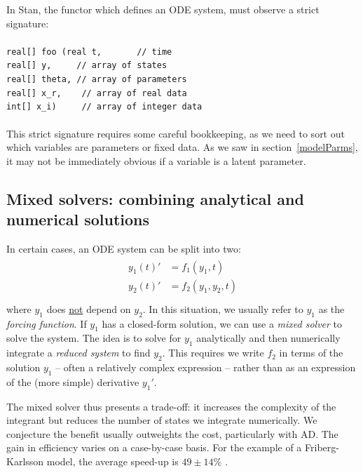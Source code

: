\documentclass[11pt]{article}
\begin{document}
In Stan, the functor which defines an ODE system, must observe a strict signature: \\ \\
% 
\texttt{real[] foo (real t,  {\ \ \ \ \ \ \color{gray}// time} \\
\phantom{real[] foo (}real[] y, {\ \ \ \ \color{gray}// array of states} \\
\phantom{real[] foo (}real[] theta, {\color{gray}// array of parameters} \\
\phantom{real[] foo (}real[] x\_r, {\ \  \color{gray} // array of real data} \\
\phantom{real[] foo (}int[] x\_i) {\ \ \ \color{gray} // array of integer data}
                   } \\ \\
%
This strict signature requires some careful bookkeeping, as we need to sort out which 
variables are parameters or fixed data. As we saw in section~\ref{modelParms}, it
may not be immediately obvious if a variable is a latent parameter.

\subsection{Mixed solvers: combining analytical and numerical solutions}

In certain cases, an ODE system can be split into two:
%
\begin{eqnarray*}
  \begin{aligned}
  y_1(t)' &= f_1(y_1, t) \\
  y_2(t)' &= f_2(y_1, y_2, t) \\
  \end{aligned}
\end{eqnarray*}
%
where $y_1$ does \underline{not} depend on $y_2$. In this situation, we usually refer to $y_1$
as the \textit{forcing function}. If $y_1$ has a closed-form solution, we can use a \textit{mixed solver} 
to solve the system. The idea is to solve for $y_1$ analytically and then 
numerically integrate a \textit{reduced system} to find $y_2$. This requires we write $f_2$ in 
terms of the solution $y_1$ -- often a relatively complex expression -- rather than as an 
expression of the (more simple) derivative $y_1'$. 

The mixed solver thus presents a trade-off: it increases the complexity of the integrant 
but reduces the number of states we integrate numerically. We conjecture the benefit usually outweights 
the cost, particularly with AD. The gain in efficiency varies on a case-by-case 
basis. For the example of a Friberg-Karlsson model, the average speed-up is $49 \pm 14 \%$
 \cite{Margossian:2017b}.
\end{document}
